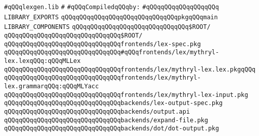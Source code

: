 \label{src/app/future-lex/src/lexgen.lib}
\verb|#qQQqlexgen.lib|\newline
\verb|#|\newline
\newline
\verb|#qQQqCompiledqQQqby:|\newline
\verb|#qQQqqQQqqQQqqQQqqQQq|\newline
\newline
\verb|LIBRARY_EXPORTS|\newline
\newline
\verb|qQQqqQQqqQQqqQQqqQQqqQQqqQQqqQQqpkgqQQqmain|\newline
\newline
\newline
\newline
\verb|LIBRARY_COMPONENTS|\newline
\newline
\verb|qQQqqQQqqQQqqQQqqQQqqQQqqQQqqQQq$ROOT/|\newline
\verb|qQQqqQQqqQQqqQQqqQQqqQQqqQQqqQQq$ROOT/|\newline
\newline
\verb|qQQqqQQqqQQqqQQqqQQqqQQqqQQqqQQqfrontends/lex-spec.pkg|\newline
\newline
\verb|qQQqqQQqqQQqqQQqqQQqqQQqqQQqqQQq#qQQqfrontends/lex/mythryl-lex.lexqQQq:qQQqMLLex|\newline
\verb|qQQqqQQqqQQqqQQqqQQqqQQqqQQqqQQqfrontends/lex/mythryl-lex.lex.pkgqQQq|\newline
\verb|qQQqqQQqqQQqqQQqqQQqqQQqqQQqqQQqfrontends/lex/mythryl-lex.grammarqQQq:qQQqMLYacc|\newline
\verb|qQQqqQQqqQQqqQQqqQQqqQQqqQQqqQQqfrontends/lex/mythryl-lex-input.pkg|\newline
\newline
\verb|qQQqqQQqqQQqqQQqqQQqqQQqqQQqqQQqbackends/lex-output-spec.pkg|\newline
\verb|qQQqqQQqqQQqqQQqqQQqqQQqqQQqqQQqbackends/output.api|\newline
\verb|qQQqqQQqqQQqqQQqqQQqqQQqqQQqqQQqbackends/expand-file.pkg|\newline
\newline
\verb|qQQqqQQqqQQqqQQqqQQqqQQqqQQqqQQqbackends/dot/dot-output.pkg|\newline
